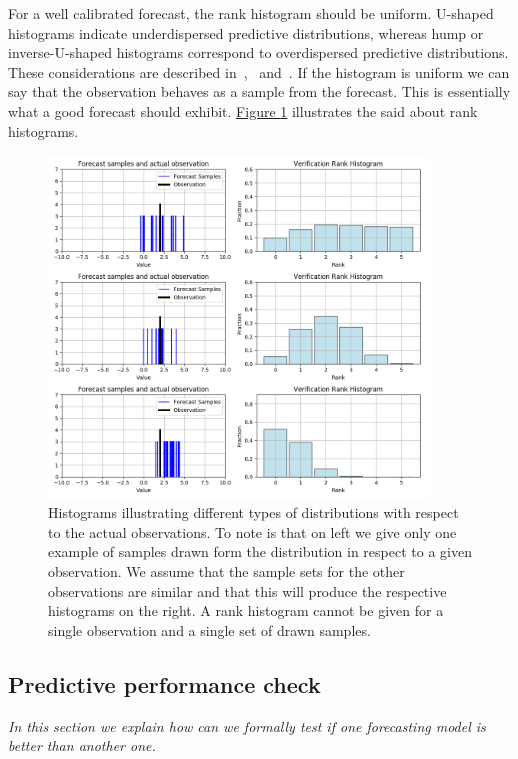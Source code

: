 \documentclass[12pt,a4paper,twoside]{scrartcl}
\numberwithin{equation}{section}
\newcommand{\reffig}[1]{\hyperref[#1]{Figure \ref*{#1}}}
\begin{document}
For a well calibrated forecast, the rank histogram should be uniform. U-shaped histograms indicate underdispersed predictive distributions, whereas hump or inverse-U-shaped histograms correspond to overdispersed predictive distributions. These considerations are described in~\cite{gneiting2014},~\cite{diebold1998} and~\cite{hamill2001}. If the histogram is uniform we can say that the observation behaves as a sample from the forecast. This is essentially what a good forecast should exhibit. \reffig{fig:rank-hist} illustrates the said about rank histograms.
\begin{center}
  \begin{figure}[H]
    \centering
    \includegraphics[height=0.75\textwidth, width=0.9\textwidth]{figures/verification_histogram.png}
    \caption[Rank Histogram Example]{Histograms illustrating different types of distributions with respect to the actual observations. To note is that on left we give only one example of samples drawn form the distribution in respect to a given observation. We assume that the sample sets for the other observations are similar and that this will produce the respective histograms on the right. A rank histogram cannot be given for a single observation and a single set of drawn samples.}\label{fig:rank-hist}
  \end{figure}
\end{center}
\subsection{Predictive performance check}\label{sec:pred-check}
\noindent\emph{In this section we explain how can we formally test if one forecasting model is better than another one.}
\end{document}
